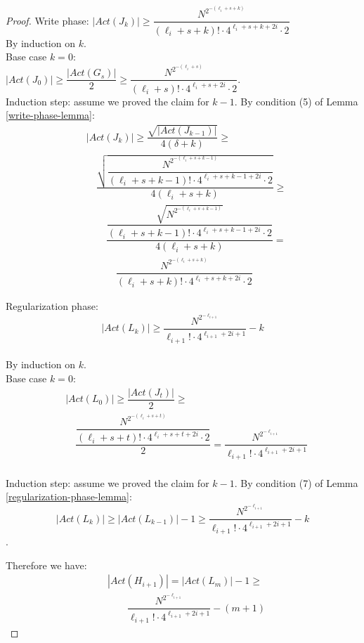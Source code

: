 \begin{proof}
	Write phase: $|Act(J_k)| \geq \dfrac{N^{2^{-(\ell_i+s+k)}}}{(\ell_i+s+k)! \cdot 4^{\ell_i+s+k+2i} \cdot 2}$
	\\ By induction on $k$.
	\\ Base case $k=0$: 
	\\ $|Act(J_0)| \geq \dfrac{|Act(G_s)|}{2} \geq \dfrac{N^{2^{-(\ell_i+s)}}}{(\ell_i+s)! \cdot 4^{\ell_i+s+2i} \cdot 2}$.
	\\ Induction step: assume we proved the claim for $k-1$. By condition (5) of Lemma \ref{write-phase-lemma}:
	\begin{align*}
	& |Act(J_k)| \geq \dfrac {\sqrt{|Act(J_{k-1})|}} {4(\delta+k)} \geq \\
	& \quad \dfrac {\sqrt{\dfrac{N^{2^{-(\ell_i+s+k-1)}}} {(\ell_i+s+k-1)! \cdot 4^{\ell_i+s+k-1+2i} \cdot 2}}} {4(\ell_i+s+k)} \geq \\
	& \qquad \dfrac {\dfrac{\sqrt{N^{2^{-(\ell_i+s+k-1)}}}} {(\ell_i+s+k-1)! \cdot 4^{\ell_i+s+k-1+2i} \cdot 2}} {4(\ell_i+s+k)} = \\
	& \qquad \quad \dfrac{N^{2^{-(\ell_i+s+k)}}}{(\ell_i+s+k)! \cdot 4^{\ell_i+s+k+2i} \cdot 2}
	\end{align*}
	
	Regularization phase:	
	 $$|Act(L_k)| \geq \dfrac{N^{2^{-\ell_{i+1}}}}{\ell_{i+1}! \cdot 4^{\ell_{i+1}+2i+1}} - k$$
	\\ By induction on $k$.
	\\ Base case $k=0$:
	\begin{align*}
	& |Act(L_0)| \geq \dfrac{|Act(J_t)|}{2} \geq \\
	& \quad \dfrac{\dfrac{N^{2^{-(\ell_i+s+t)}}}{(\ell_i+s+t)! \cdot 4^{\ell_i+s+t+2i} \cdot 2}}{2} = \dfrac{N^{2^{-\ell_{i+1}}}}{\ell_{i+1}! \cdot 4^{\ell_{i+1}+2i+1}}
	\end{align*}
	\\ Induction step: assume we proved the claim for $k-1$. By condition (7) of Lemma \ref{regularization-phase-lemma}:
	$$|Act(L_k)| \geq |Act(L_{k-1})|-1 \geq \dfrac{N^{2^{-\ell_{i+1}}}}{\ell_{i+1}! \cdot 4^{\ell_{i+1}+2i+1}} - k$$.
	
	Therefore we have:
	\begin{equation} \label{eq: Act(H_i)-bound}
		\begin{aligned}
			& |Act(H_{i+1})| = |Act(L_m)| - 1 \geq \\
			& \qquad \dfrac{N^{2^{-\ell_{i+1}}}} {\ell_{i+1}! \cdot 4^{\ell_{i+1}+2i+1}}-(m+1)
		\end{aligned}
	\end{equation}
	

\end{proof}
